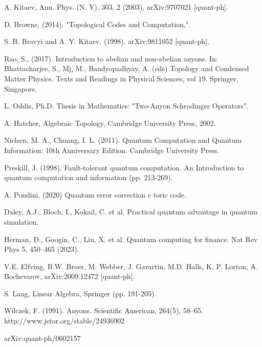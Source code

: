 \documentclass[12pt]{report}
\begin{document}
	\begin{thebibliography}{99} %
		 A. Kitaev, Ann. Phys. (N. Y). 303, 2 (2003),
		arXiv:9707021 [quant-ph].
		
		
		
		 D. Browne, (2014). "Topological Codes and Computation,".
		
		 S. B. Bravyi and A. Y. Kitaev, (1998).
		arXiv:9811052 [quant-ph].
		
		  Rao, S., (2017). Introduction to abelian and non-abelian anyons. In: Bhattacharjee, S., Mj, M., Bandyopadhyay, A. (eds) Topology and Condensed Matter Physics. Texts and Readings in Physical Sciences, vol 19. Springer, Singapore. %
		
		
		 L. Oddis, Ph.D. Thesis in Mathematics: "Two-Anyon Schrodinger Operators".
		
		 A. Hatcher, Algebraic Topology, Cambridge University Press, 2002.
		
		 Nielsen, M. A., Chuang, I. L. (2011). Quantum Computation and Quantum Information: 10th Anniversary Edition. Cambridge University Press.
		
		 Preskill, J. (1998). Fault-tolerant quantum computation. An Introduction to quantum computation and information (pp. 213-269).
		
		 A. Pondini, (2020) Quantum error correction e toric code.
		
		 Daley, A.J., Bloch, I., Kokail, C. et al. Practical quantum advantage in quantum simulation.
		
		 Herman, D., Googin, C., Liu, X. et al. Quantum computing for finance. Nat Rev Phys 5, 450–465 (2023).
		
		 V.E. Elfving, B.W. Broer, M. Webber, J. Gavartin, M.D. Halls, K. P. Lorton, A. Bochevarov, arXiv:2009.12472 [quant-ph].
		
		 S. Lang, Linear Algebra, Springer (pp. 191-205).
		
		 Wilczek, F. (1991). Anyons. Scientific American, 264(5), 58–65. http://www.jstor.org/stable/24936902


                	arXiv:quant-ph/0602157
  
	\end{thebibliography}
	
\end{document}
